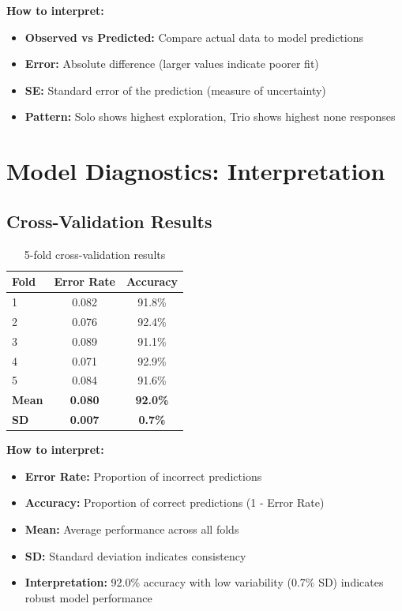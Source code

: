 \documentclass[11pt]{article}
\begin{document}
\textbf{How to interpret:}
\begin{itemize}
    \item \textbf{Observed vs Predicted:} Compare actual data to model predictions
    \item \textbf{Error:} Absolute difference (larger values indicate poorer fit)
    \item \textbf{SE:} Standard error of the prediction (measure of uncertainty)
    \item \textbf{Pattern:} Solo shows highest exploration, Trio shows highest none responses
\end{itemize}

\section{Model Diagnostics: Interpretation}

\subsection{Cross-Validation Results}

\begin{table}[h]
\centering
\begin{tabular}{lcc}
\toprule
\textbf{Fold} & \textbf{Error Rate} & \textbf{Accuracy} \\
\midrule
1 & 0.082 & 91.8\% \\
2 & 0.076 & 92.4\% \\
3 & 0.089 & 91.1\% \\
4 & 0.071 & 92.9\% \\
5 & 0.084 & 91.6\% \\
\midrule
\textbf{Mean} & \textbf{0.080} & \textbf{92.0\%} \\
\textbf{SD} & \textbf{0.007} & \textbf{0.7\%} \\
\bottomrule
\end{tabular}
\caption{5-fold cross-validation results}
\end{table}

\textbf{How to interpret:}
\begin{itemize}
    \item \textbf{Error Rate:} Proportion of incorrect predictions
    \item \textbf{Accuracy:} Proportion of correct predictions (1 - Error Rate)
    \item \textbf{Mean:} Average performance across all folds
    \item \textbf{SD:} Standard deviation indicates consistency
    \item \textbf{Interpretation:} 92.0\% accuracy with low variability (0.7\% SD) indicates robust model performance
\end{itemize}
\end{document}
